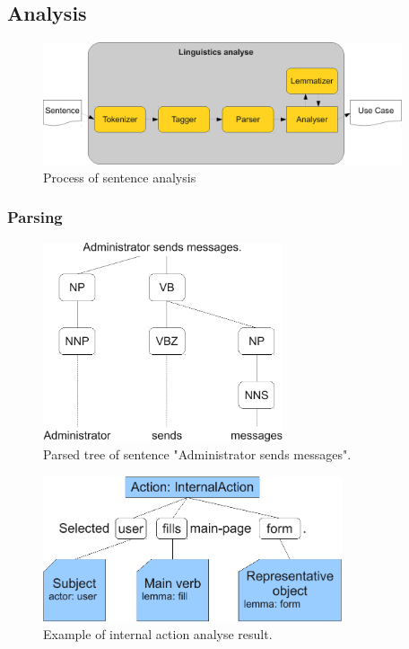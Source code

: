 \subsection{Analysis}
\label{sec:analysis}

\begin{figure}[ht]
  \centering
  \includegraphics[width=300pt]{images/LinguisticsAnalyse}
  \caption{Process of sentence analysis}
  \label{fig:LinguisticsAnalyse}
\end{figure}

\subsubsection{Parsing}

\begin{figure}[ht]
  \centering
  \includegraphics[width=200pt]{images/ParsedTree}
  \caption{Parsed tree of sentence "Administrator sends messages".}
  \label{fig:ParsedTree}
\end{figure}

\begin{figure}[ht]
  \centering
  \includegraphics[width=250pt]{images/InternalActionExample}
  \caption{Example of internal action analyse result.}
  \label{fig:InternalActionExample}
\end{figure}

